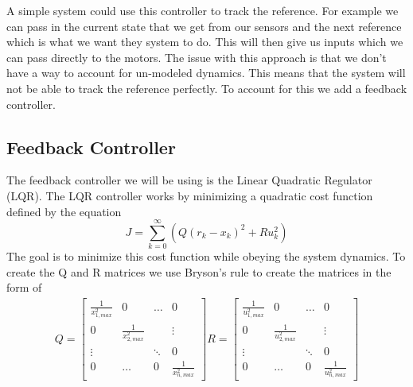 \documentclass{scrartcl}
\begin{document}
A simple system could use this controller to track the reference. For example we can pass in the current state that we get from our sensors and the next reference which is what we want they system to do. This will then give us inputs which we can pass directly to the motors.
The issue with this approach is that we don't have a way to account for un-modeled dynamics. This means that the system will not be able to track the reference perfectly.
To account for this we add a feedback controller.

\subsection{Feedback Controller}
The feedback controller we will be using is the Linear Quadratic Regulator (LQR).
The LQR controller works by minimizing a quadratic cost function defined by the equation
\begin{equation}
    J = \sum_{k=0}^\infty (Q(r_k - x_k)^2 + R u_k^2)
\end{equation}
The goal is to minimize this cost function while obeying the system dynamics.
To create the Q and R matrices we use Bryson's rule to create the matrices in the form of
\begin{align}
    Q = \begin{bmatrix}
            \frac{1}{x_{1,\mathit{max}}^2} & 0                              & \hdots & 0                              \\
            0                              & \frac{1}{x_{2,\mathit{max}}^2} &        & \vdots                         \\
            \vdots                         &                                & \ddots & 0                              \\
            0                              & \hdots                         & 0      & \frac{1}{x_{n,\mathit{max}}^2}
        \end{bmatrix}
    R = \begin{bmatrix}
            \frac{1}{u_{1,\mathit{max}}^2} & 0                              & \hdots & 0                              \\
            0                              & \frac{1}{u_{2,\mathit{max}}^2} &        & \vdots                         \\
            \vdots                         &                                & \ddots & 0                              \\
            0                              & \hdots                         & 0      & \frac{1}{u_{n,\mathit{max}}^2}
        \end{bmatrix}
\end{align}
\end{document}
